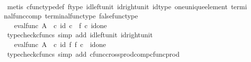 \begin{isabellebody}
\ \ \ \ \ \ \ \ \ \isamarkupfalse%
\ {\isacharparenleft}{\kern0pt}metis\ cfunc{\isacharunderscore}{\kern0pt}type{\isacharunderscore}{\kern0pt}def\ f{\isacharunderscore}{\kern0pt}type\ id{\isacharunderscore}{\kern0pt}left{\isacharunderscore}{\kern0pt}unit\ id{\isacharunderscore}{\kern0pt}right{\isacharunderscore}{\kern0pt}unit\ id{\isacharunderscore}{\kern0pt}type\ one{\isacharunderscore}{\kern0pt}unique{\isacharunderscore}{\kern0pt}element\ terminal{\isacharunderscore}{\kern0pt}func{\isacharunderscore}{\kern0pt}comp\ terminal{\isacharunderscore}{\kern0pt}func{\isacharunderscore}{\kern0pt}type\ false{\isacharunderscore}{\kern0pt}func{\isacharunderscore}{\kern0pt}type{\isacharparenright}{\kern0pt}\isanewline
\ \ \ \ \ \ \ \isamarkupfalse%
\ \isamarkupfalse%
\ {\isachardoublequoteopen}{\isachardot}{\kern0pt}{\isachardot}{\kern0pt}{\isachardot}{\kern0pt}\ {\isacharequal}{\kern0pt}\ eval{\isacharunderscore}{\kern0pt}func\ A\ {\isasymOmega}\ {\isasymcirc}\isactrlsub c\ {\isasymlangle}id{\isacharparenleft}{\kern0pt}{\isasymOmega}{\isacharparenright}{\kern0pt}\ {\isasymcirc}\isactrlsub c\ {\isasymf}{\isacharcomma}{\kern0pt}\ f\ {\isasymcirc}\isactrlsub c\ id{\isacharparenleft}{\kern0pt}one{\isacharparenright}{\kern0pt}{\isasymrangle}{\isachardoublequoteclose}\isanewline
\ \ \ \ \ \ \ \ \ \isamarkupfalse%
\ {\isacharparenleft}{\kern0pt}typecheck{\isacharunderscore}{\kern0pt}cfuncs{\isacharcomma}{\kern0pt}\ simp\ add{\isacharcolon}{\kern0pt}\ id{\isacharunderscore}{\kern0pt}left{\isacharunderscore}{\kern0pt}unit{}\ id{\isacharunderscore}{\kern0pt}right{\isacharunderscore}{\kern0pt}unit{}{\isacharparenright}{\kern0pt}\isanewline
\ \ \ \ \ \ \ \isamarkupfalse%
\ \isamarkupfalse%
\ {\isachardoublequoteopen}{\isachardot}{\kern0pt}{\isachardot}{\kern0pt}{\isachardot}{\kern0pt}\ {\isacharequal}{\kern0pt}\ eval{\isacharunderscore}{\kern0pt}func\ A\ {\isasymOmega}\ {\isasymcirc}\isactrlsub c\ {\isacharparenleft}{\kern0pt}id{\isacharparenleft}{\kern0pt}{\isasymOmega}{\isacharparenright}{\kern0pt}\ {\isasymtimes}\isactrlsub f\ f{\isacharparenright}{\kern0pt}\ {\isasymcirc}\isactrlsub c\ {\isasymlangle}{\isasymf}{\isacharcomma}{\kern0pt}\ id{\isacharparenleft}{\kern0pt}one{\isacharparenright}{\kern0pt}{\isasymrangle}{\isachardoublequoteclose}\isanewline
\ \ \ \ \ \ \ \ \ \isamarkupfalse%
\ {\isacharparenleft}{\kern0pt}typecheck{\isacharunderscore}{\kern0pt}cfuncs{\isacharcomma}{\kern0pt}\ simp\ add{\isacharcolon}{\kern0pt}\ cfunc{\isacharunderscore}{\kern0pt}cross{\isacharunderscore}{\kern0pt}prod{\isacharunderscore}{\kern0pt}comp{\isacharunderscore}{\kern0pt}cfunc{\isacharunderscore}{\kern0pt}prod{\isacharparenright}{\kern0pt}\isanewline

\end{isabellebody}
